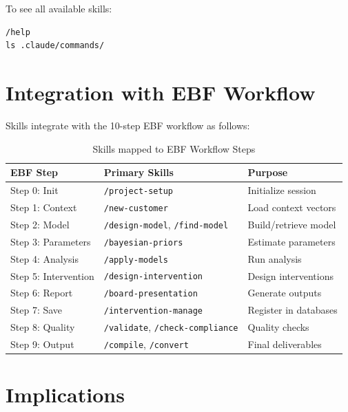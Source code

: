 To see all available skills:
\begin{verbatim}
/help
ls .claude/commands/
\end{verbatim}


\section{Integration with EBF Workflow}
\label{sec:skills-integration}

Skills integrate with the 10-step EBF workflow as follows:

\begin{table}[htbp]
\centering
\begin{tabular}{|l|l|l|}
\hline
\textbf{EBF Step} & \textbf{Primary Skills} & \textbf{Purpose} \\
\hline
Step 0: Init & \texttt{/project-setup} & Initialize session \\
Step 1: Context & \texttt{/new-customer} & Load context vectors \\
Step 2: Model & \texttt{/design-model}, \texttt{/find-model} & Build/retrieve model \\
Step 3: Parameters & \texttt{/bayesian-priors} & Estimate parameters \\
Step 4: Analysis & \texttt{/apply-models} & Run analysis \\
Step 5: Intervention & \texttt{/design-intervention} & Design interventions \\
Step 6: Report & \texttt{/board-presentation} & Generate outputs \\
Step 7: Save & \texttt{/intervention-manage} & Register in databases \\
Step 8: Quality & \texttt{/validate}, \texttt{/check-compliance} & Quality checks \\
Step 9: Output & \texttt{/compile}, \texttt{/convert} & Final deliverables \\
\hline
\end{tabular}
\caption{Skills mapped to EBF Workflow Steps}
\end{table}


\section{Implications}
\label{sec:skills-implications}

